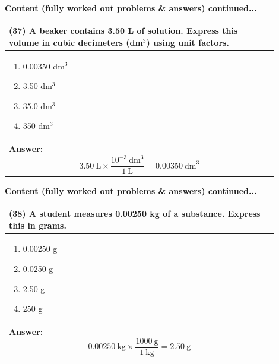 \documentclass{article}
\begin{document}
\newpage
\noindent
{\large\textbf{Content (fully worked out problems \& answers) continued...}}\\[0.2em]
\vspace{0.2cm}
\begin{tabular}{|p{0.9\linewidth}|}
\hline
\vspace{0.2cm}
\textbf{(37)} A beaker contains 3.50 L of solution. Express this volume in cubic decimeters (dm$^3$) using unit factors.\\
\hline
\vspace{0.2cm}
\begin{minipage}[t]{0.85\linewidth}
\begin{enumerate}[label=\alph*.]
\item 0.00350 dm$^3$ \
\item 3.50 dm$^3$ \
\item 35.0 dm$^3$ \
\item 350 dm$^3$
\end{enumerate}
\end{minipage} \\
\hline
\vspace{0.2cm}
\textbf{Answer:} 
\[
3.50~\text{L} \times \frac{{10^{-3}}~\text{dm}^3}{1~\text{L}} = 0.00350~\text{dm}^3
\] \\
\hline
\end{tabular}

\newpage
\noindent
{\large\textbf{Content (fully worked out problems \& answers) continued...}}\\[0.2em]
\vspace{0.2cm}
\begin{tabular}{|p{0.9\linewidth}|}
\hline
\vspace{0.2cm}
\textbf{(38)} A student measures 0.00250 kg of a substance. Express this in grams.\\
\hline
\vspace{0.2cm}
\begin{minipage}[t]{0.85\linewidth}
\begin{enumerate}[label=\alph*.]
\item 0.00250 g \
\item 0.0250 g \
\item 2.50 g \
\item 250 g 
\end{enumerate}
\end{minipage}\\
\hline
\vspace{0.2cm}
\textbf{Answer:} 
\[
0.00250~\text{kg} \times \frac{1000~\text{g}}{1~\text{kg}} = 2.50~\text{g}
\] \\ 
\hline
\end{tabular}
\end{document}

